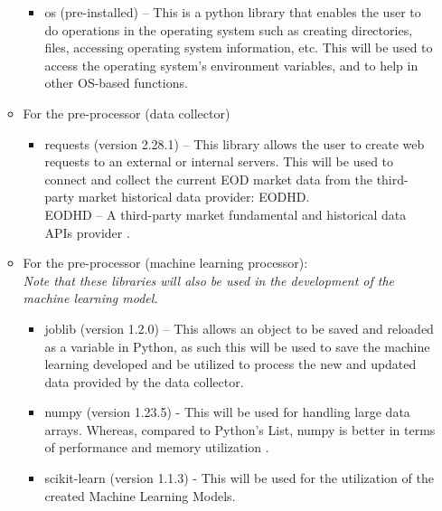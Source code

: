 \begin{itemize}
\begin{itemize}
\begin{itemize}
                    \item[\ding{109}] os (pre-installed) – This is a python library that enables 
                    the user to do operations in the operating system such as creating directories, 
                    files, accessing operating system information, etc. This will be used to access 
                    the operating system’s environment variables, and to help in other OS-based functions.
                \end{itemize}
            \item[\ding{108}] For the pre-processor (data collector)
                \begin{itemize}
                    \item[\ding{109}] requests (version 2.28.1) – This library allows the user to create web 
                    requests to an external or internal servers. This will be used to connect and collect 
                    the current EOD market data from the third-party market historical data provider: EODHD.
                    \\ EODHD – A third-party market fundamental and historical data APIs provider
                    \cite{EODHD}.
                \end{itemize}
            \item[\ding{108}] For the pre-processor (machine learning processor):
            \\ \textit{Note that these libraries will also be used in the development of the machine learning model.}
                \begin{itemize}
                    \item[\ding{109}] joblib (version 1.2.0) – This allows an object to be 
                    saved and reloaded as a variable in Python, as such this will be used to 
                    save the machine learning developed and be utilized to process the new and 
                    updated data provided by the data collector.
                    \item[\ding{109}] numpy (version 1.23.5) - This will be used for handling large data arrays. Whereas,
                    compared to Python's List, numpy is better in terms of performance and memory utilization \cite{GeekforGeeks_numpyVSlist}.
                    \item[\ding{109}] scikit-learn (version 1.1.3) - This will be used for the utilization of the created Machine Learning Models.
                \end{itemize}

\end{itemize}
\end{itemize}
